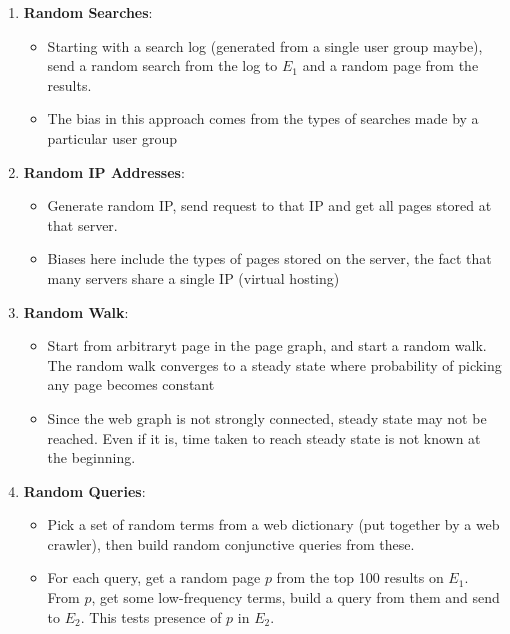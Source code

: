 \documentclass{article}
\begin{document}
\begin{enumerate}
    \item \textbf{Random Searches}: 
    \begin{itemize}
        \item Starting with a search log (generated from a single user group maybe), send a random search from the log to $E_1$ and a random page from the results. 
    
        \item The bias in this approach comes from the types of searches made by a particular user group
    \end{itemize}
    
    \item \textbf{Random IP Addresses}:
    \begin{itemize}
        \item Generate random IP, send request to that IP and get all pages stored at that server. 
    
        \item Biases here include the types of pages stored on the server, the fact that many servers share a single IP (virtual hosting)
    \end{itemize}
    
    \item \textbf{Random Walk}:
    \begin{itemize}
        \item Start from arbitraryt page in the page graph, and start a random walk. The random walk converges to a steady state where probability of picking any page becomes constant
    
        \item Since the web graph is not strongly connected, steady state may not be reached. Even if it is, time taken to reach steady state is not known at the beginning.
    \end{itemize}
    
    \item \textbf{Random Queries}:
    \begin{itemize}
        \item Pick a set of random terms from a web dictionary (put together by a web crawler), then build random conjunctive queries from these.
    
        \item For each query, get a random page $p$ from the top 100 results on $E_1$. From $p$, get some low-frequency terms, build a query from them and send to $E_2$. This tests presence of $p$ in $E_2$. 
        

\end{itemize}
\end{enumerate}
\end{document}
